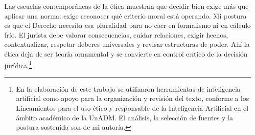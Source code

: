 \documentclass[
	spanish, %
	letterpaper, oneside
]{article}
\begin{document}
Las escuelas contemporáneas de la ética muestran que decidir bien exige más que aplicar una norma: exige reconocer qué criterio moral está operando. Mi postura es que el Derecho necesita esa pluralidad para no caer en formalismo ni en cálculo frío. El jurista debe valorar consecuencias, cuidar relaciones, exigir hechos, contextualizar, respetar deberes universales y revisar estructuras de poder. Ahí la ética deja de ser teoría ornamental y se convierte en control crítico de la decisión jurídica.\footnote{En la elaboración de este trabajo se utilizaron herramientas de inteligencia artificial como apoyo para la organización y revisión del texto, conforme a los Lineamientos para el uso ético y responsable de la Inteligencia Artificial en el ámbito académico de la UnADM. El análisis, la selección de fuentes y la postura sostenida son de mi autoría.}

\clearpage


\end{document}
